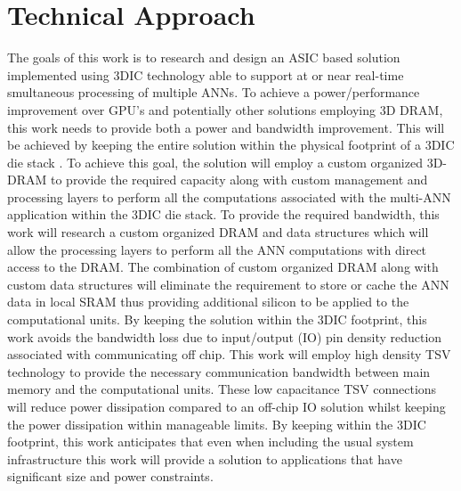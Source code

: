 

\chapter{Technical Approach}
\label{chap-four}

The goals of this work is to research and design an ASIC based solution implemented using 3DIC technology able to support at or near real-time smultaneous 
processing of multiple ANNs. 
To achieve a power/performance improvement over GPU's and potentially other solutions employing 3D DRAM, this work
needs to provide both a power and bandwidth improvement. 
This will be achieved by keeping the entire solution within the physical footprint of a 3DIC die stack \cite{tsai2008design}.
To achieve this goal, the solution will employ a custom organized 3D-DRAM to provide the required capacity along with custom management and processing
layers to perform all the computations associated with the multi-ANN application within the 3DIC die stack.
To provide the required bandwidth, this work will research a custom organized DRAM and data structures which will allow the processing layers
to perform all the ANN computations with direct access to the DRAM.
The combination of custom organized DRAM along with custom data structures will eliminate the requirement to store or cache the ANN data in 
local SRAM thus providing additional silicon to be applied to the computational units.
By keeping the solution within the 3DIC footprint, this work avoids the bandwidth loss due to input/output (IO) pin density reduction
associated with communicating off chip.
This work will employ high density TSV technology to provide the necessary communication bandwidth between main memory and the computational units.
These low capacitance TSV connections will reduce power dissipation compared to an off-chip IO solution whilst keeping the power dissipation within 
manageable limits.
By keeping within the 3DIC footprint, this work anticipates that even when including the usual system infrastructure this work will provide
a solution to applications that have significant size and power constraints.

